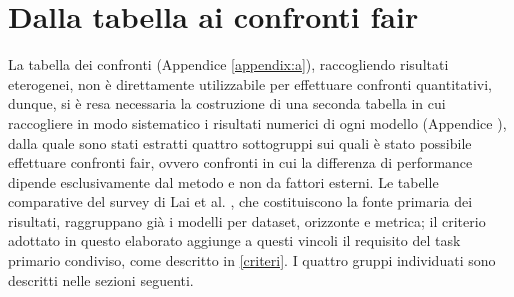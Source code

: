 \section{Dalla tabella ai confronti fair}
La tabella dei confronti (Appendice \ref{appendix:a}), raccogliendo risultati eterogenei, non è direttamente utilizzabile per effettuare confronti quantitativi, dunque, si è resa necessaria la costruzione di una seconda tabella in cui raccogliere in modo sistematico i risultati numerici di ogni modello (Appendice ), dalla quale sono stati estratti quattro sottogruppi sui quali è stato possibile effettuare confronti fair, ovvero confronti in cui la differenza di performance dipende esclusivamente dal metodo e non da fattori esterni.
Le tabelle comparative del survey di Lai et al. \cite{lai2024human}, che costituiscono la fonte primaria dei risultati, raggruppano già i modelli per dataset, orizzonte e metrica; il criterio adottato in questo elaborato aggiunge a questi vincoli il requisito del task primario condiviso, come descritto in \ref{criteri}. I quattro gruppi individuati sono descritti nelle sezioni seguenti.


